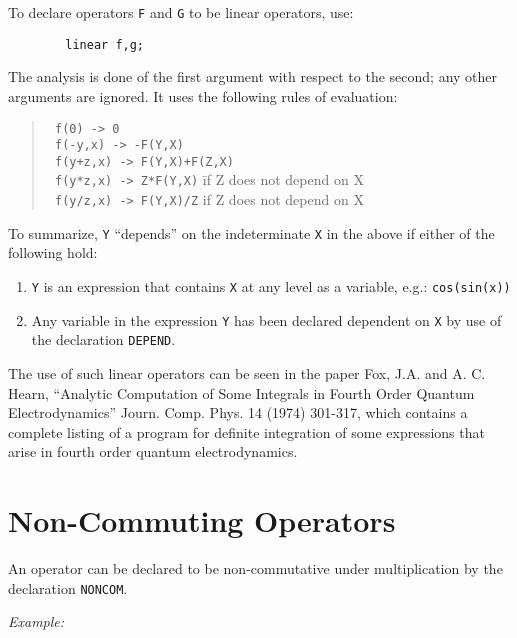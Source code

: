 To declare operators \texttt{F} and \texttt{G} to be linear operators,
use:
\begin{verbatim}
        linear f,g;
\end{verbatim}
The analysis is done of the first argument with respect to the second; any
other arguments are ignored. It uses the following rules of evaluation:
\begin{quote}
\begin{tabbing}
\texttt{   f(0)      ->   0} \\
\texttt{   f(-y,x)   ->  -F(Y,X)} \\
\texttt{   f(y+z,x)  ->   F(Y,X)+F(Z,X)} \\
\texttt{   f(y*z,x)  ->   Z*F(Y,X)} \hspace{0.5in}\= if Z does not depend on X \\
\texttt{   f(y/z,x)  ->   F(Y,X)/Z} \> if Z does not depend on X
\end{tabbing}
\end{quote}
To summarize, \texttt{Y} ``depends'' on the indeterminate \texttt{X} in the above
if either of the following hold:
\begin{enumerate}
\item \texttt{Y} is an expression that contains \texttt{X} at any level as a
      variable, e.g.: \texttt{cos(sin(x))}

\item Any variable in the expression \texttt{Y} has been declared dependent on
      \texttt{X} by use of the declaration \texttt{DEPEND}.
\end{enumerate}
The use of such linear operators can be seen in the
paper Fox, J.A. and A. C. Hearn, ``Analytic Computation of Some Integrals
in Fourth Order Quantum Electrodynamics'' Journ. Comp. Phys. 14 (1974)
301-317, which contains a complete listing of a program for definite
integration of some expressions that arise in fourth
order quantum electrodynamics.

\section{Non-Commuting Operators}
\hypertarget{command:NONCOM}{}
An operator can be declared to be non-commutative under multiplication by
the declaration \texttt{NONCOM}.

\textit{Example:}

